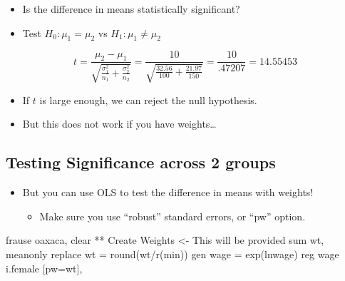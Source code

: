 \documentclass[
  letterpaper,
  DIV=11,
  numbers=noendperiod]{scrartcl}
\newenvironment{Shaded}{\begin{snugshade}}{\end{snugshade}}
\newcommand{\FunctionTok}[1]{\textcolor[rgb]{0.28,0.35,0.67}{#1}}
\newcommand{\KeywordTok}[1]{\textcolor[rgb]{0.00,0.23,0.31}{#1}}
\newcommand{\NormalTok}[1]{\textcolor[rgb]{0.00,0.23,0.31}{#1}}
\providecommand{\tightlist}{%
  \setlength{\itemsep}{0pt}\setlength{\parskip}{0pt}}\usepackage{longtable,booktabs,array}
\begin{document}
\begin{itemize}
\item
  Is the difference in means statistically significant?
\item
  Test \(H_0: \mu_1 = \mu_2\) vs \(H_1: \mu_1 \neq \mu_2\)
\end{itemize}

\[t = \frac{\mu_2 - \mu_1}{\sqrt{\frac{\sigma_1^2}{n_1} + \frac{\sigma_2^2}{n_2}}}
=\frac{10}{\sqrt{\frac{32.56}{100}+\frac{21.97}{150}}}=\frac{10}{.47207} = 14.55453
\]

\begin{itemize}
\item
  If \(t\) is large enough, we can reject the null hypothesis.
\item
  But this does not work if you have weights\ldots{}
\end{itemize}

\subsection{Testing Significance across 2
groups}\label{testing-significance-across-2-groups-1}

\begin{itemize}
\tightlist
\item
  But you can use OLS to test the difference in means with weights!

  \begin{itemize}
  \tightlist
  \item
    Make sure you use ``robust'' standard errors, or ``pw'' option.
  \end{itemize}
\end{itemize}

\begin{Shaded}
\begin{Highlighting}[]
\NormalTok{ frause oaxaca, }\KeywordTok{clear}
\NormalTok{** Create Weights \textless{}{-} This will }\KeywordTok{be}\NormalTok{ provided}
\KeywordTok{sum}\NormalTok{ wt, }\KeywordTok{meanonly}
\KeywordTok{replace}\NormalTok{ wt = }\FunctionTok{round}\NormalTok{(wt/}\FunctionTok{r}\NormalTok{(}\FunctionTok{min}\NormalTok{))}
\KeywordTok{gen}\NormalTok{ wage = }\FunctionTok{exp}\NormalTok{(lnwage)}
\KeywordTok{reg}\NormalTok{ wage i.female [pw=wt],}
\end{Highlighting}
\end{Shaded}
\end{document}
